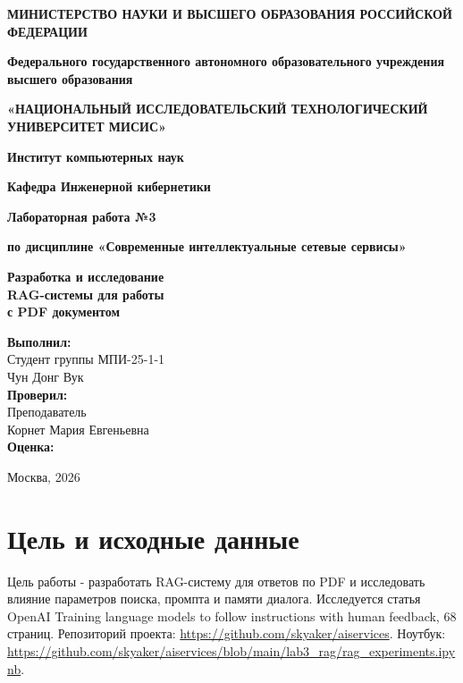 \documentclass[12pt,a4paper]{article}
\begin{document}
\hypersetup{pageanchor=false}
\begin{titlepage}
\begin{center}
\textbf{МИНИСТЕРСТВО НАУКИ И ВЫСШЕГО ОБРАЗОВАНИЯ РОССИЙСКОЙ ФЕДЕРАЦИИ}
\vspace{0.5cm}

\textbf{Федерального государственного автономного образовательного учреждения \\ высшего образования}
\vspace{0.3cm}

\textbf{«НАЦИОНАЛЬНЫЙ ИССЛЕДОВАТЕЛЬСКИЙ ТЕХНОЛОГИЧЕСКИЙ УНИВЕРСИТЕТ МИСИС»}
\vspace{2cm}

\textbf{Институт компьютерных наук}
\vspace{0.3cm}

\textbf{Кафедра Инженерной кибернетики}
\vspace{1cm}

\textbf{Лабораторная работа №3}
\vspace{0.3cm}

\textbf{по дисциплине «Современные интеллектуальные сетевые сервисы»}
\vspace{1.5cm}

\LARGE{\textbf{Разработка и исследование \\ RAG-системы для работы \\ с PDF документом}}
\vspace{2cm}
\end{center}
\begin{flushright}
\textbf{Выполнил:} \\
Студент группы МПИ-25-1-1 \\
Чун Донг Вук \\
\vspace{0.5cm}
\textbf{Проверил:} \\
Преподаватель \\
Корнет Мария Евгеньевна \\
\vspace{2cm}
\textbf{Оценка:} \hrulefill
\end{flushright}
\begin{center}\vfill Москва, 2026\end{center}
\end{titlepage}
\hypersetup{pageanchor=true}
\tableofcontents\newpage
\section{Цель и исходные данные}
Цель работы - разработать RAG-систему для ответов по PDF и исследовать влияние параметров поиска, промпта и памяти диалога. Исследуется статья OpenAI Training language models to follow instructions with human feedback, 68 страниц. Репозиторий проекта: \url{https://github.com/skyaker/aiservices}. Ноутбук: \url{https://github.com/skyaker/aiservices/blob/main/lab3_rag/rag_experiments.ipynb}.
\end{document}
